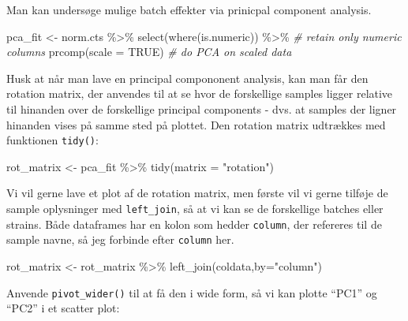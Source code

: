 \documentclass[
]{book}
\newenvironment{Shaded}{\begin{snugshade}}{\end{snugshade}}
\newcommand{\AttributeTok}[1]{\textcolor[rgb]{0.77,0.63,0.00}{#1}}
\newcommand{\CommentTok}[1]{\textcolor[rgb]{0.56,0.35,0.01}{\textit{#1}}}
\newcommand{\ConstantTok}[1]{\textcolor[rgb]{0.00,0.00,0.00}{#1}}
\newcommand{\FunctionTok}[1]{\textcolor[rgb]{0.00,0.00,0.00}{#1}}
\newcommand{\NormalTok}[1]{#1}
\newcommand{\OtherTok}[1]{\textcolor[rgb]{0.56,0.35,0.01}{#1}}
\newcommand{\SpecialCharTok}[1]{\textcolor[rgb]{0.00,0.00,0.00}{#1}}
\newcommand{\StringTok}[1]{\textcolor[rgb]{0.31,0.60,0.02}{#1}}
\begin{document}
Man kan undersøge mulige batch effekter via prinicpal component analysis.

\begin{Shaded}
\begin{Highlighting}[]
\NormalTok{pca\_fit }\OtherTok{\textless{}{-}}\NormalTok{ norm.cts }\SpecialCharTok{\%\textgreater{}\%}
  \FunctionTok{select}\NormalTok{(}\FunctionTok{where}\NormalTok{(is.numeric)) }\SpecialCharTok{\%\textgreater{}\%} \CommentTok{\# retain only numeric columns}
  \FunctionTok{prcomp}\NormalTok{(}\AttributeTok{scale =} \ConstantTok{TRUE}\NormalTok{) }\CommentTok{\# do PCA on scaled data}
\end{Highlighting}
\end{Shaded}

Husk at når man lave en principal compononent analysis, kan man får den rotation matrix, der anvendes til at se hvor de forskellige samples ligger relative til hinanden over de forskellige principal components - dvs. at samples der ligner hinanden vises på samme sted på plottet. Den rotation matrix udtrækkes med funktionen \texttt{tidy()}:

\begin{Shaded}
\begin{Highlighting}[]
\NormalTok{rot\_matrix }\OtherTok{\textless{}{-}}\NormalTok{ pca\_fit }\SpecialCharTok{\%\textgreater{}\%}
  \FunctionTok{tidy}\NormalTok{(}\AttributeTok{matrix =} \StringTok{"rotation"}\NormalTok{) }
\end{Highlighting}
\end{Shaded}

Vi vil gerne lave et plot af de rotation matrix, men første vil vi gerne tilføje de sample oplysninger med \texttt{left\_join}, så at vi kan se de forskellige batches eller strains. Både dataframes har en kolon som hedder \texttt{column}, der refereres til de sample navne, så jeg forbinde efter \texttt{column} her.

\begin{Shaded}
\begin{Highlighting}[]
\NormalTok{rot\_matrix }\OtherTok{\textless{}{-}}\NormalTok{ rot\_matrix  }\SpecialCharTok{\%\textgreater{}\%} 
  \FunctionTok{left\_join}\NormalTok{(coldata,}\AttributeTok{by=}\StringTok{"column"}\NormalTok{)}
\end{Highlighting}
\end{Shaded}

Anvende \texttt{pivot\_wider()} til at få den i wide form, så vi kan plotte ``PC1'' og ``PC2'' i et scatter plot:
\end{document}
